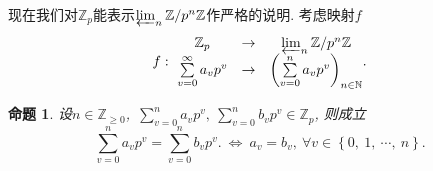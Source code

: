 \documentclass[UTF8, twoside]{ctexart}
\theoremstyle{nonumberplain}
\theoremstyle{nonumberplain}
\theoremstyle{plain}
\newtheorem{mingti}[dingyi]{命题}
\begin{document}
	现在我们对${{\mathbb{Z}}_{p}}$能表示$\varprojlim_n \mathbb{Z} /{{p}^{n}\mathbb{Z}}$作严格的说明. 考虑映射$f$
	\[f:\ \begin{matrix}
		{{\mathbb{Z}}_{p}} & \to  & \varprojlim_n \mathbb{Z} /{{p}^{n}\mathbb{Z}}  \\
		\sum\limits_{v=0}^{\infty }{{{a}_{v}}{{p}^{v}}} & \to  & {{\left( \sum\limits_{v=0}^{n}{{{a}_{v}}{{p}^{v}}} \right)}_{n\in \mathbb{N}}}
	\end{matrix}.\]
	\begin{mingti} \label{Zp单射引理}
		设$n\in {{\mathbb{Z}}_{\ge 0}}$,\ $\sum_{v=0}^{n}{{{a}_{v}}{{p}^{v}}},
		\ \sum_{v=0}^{n}{{{b}_{v}}{{p}^{v}}}\in {{\mathbb{Z}}_{p}}$, 则成立
		\[
			\sum\limits_{v=0}^{n }{{{a}_{v}}{{p}^{v}}}=\sum\limits_{v=0}^{n}{{{b}_{v}}{{p}^{v}}}.
			\ \Longleftrightarrow \ 
			{{a}_{v}}={{b}_{v}},\ \forall v\in \left\{ 0,\ 1,\ \cdots,\ n \right\}.
		\]
	\end{mingti}
\end{document}
